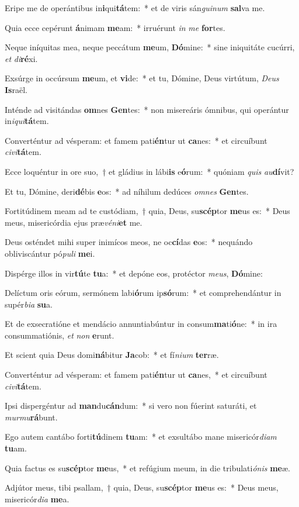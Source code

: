 \item Eripe me de operántibus in\textbf{i}qui\textbf{tá}tem:~* et de viris sán\textit{gui}\textit{num} \textbf{sal}va me.
\item Quia ecce cepérunt \textbf{á}nimam \textbf{me}am:~* irruérunt \textit{in} \textit{me} \textbf{for}tes.
\item Neque iníquitas mea, neque peccátum \textbf{me}um, \textbf{Dó}mine:~* sine iniquitáte cucúrri, \textit{et} \textit{di}\textbf{ré}xi.
\item Exsúrge in occúrsum \textbf{me}um, et \textbf{vi}de:~* et tu, Dómine, Deus virtútum, \textit{De}\textit{us} \textbf{Is}raël.
\item Inténde ad visitándas \textbf{om}nes \textbf{Gen}tes:~* non misereáris ómnibus, qui operántur in\textit{i}\textit{qui}\textbf{tá}tem.
\item Converténtur ad vésperam: et famem pati\textbf{én}tur ut \textbf{ca}nes:~* et circuíbunt \textit{ci}\textit{vi}\textbf{tá}tem.
\item Ecce loquéntur in ore suo,~† et gládius in lábi\textbf{is} e\textbf{ó}rum:~* quóniam \textit{quis} \textit{au}\textbf{dí}vit?
\item Et tu, Dómine, deri\textbf{dé}bis \textbf{e}os:~* ad níhilum dedúces \textit{om}\textit{nes} \textbf{Gen}tes.
\item Fortitúdinem meam ad te custódiam,~† quia, Deus, su\textbf{scép}tor \textbf{me}us es:~* Deus meus, misericórdia ejus præ\textit{vé}\textit{ni}\textbf{et} me.
\item Deus osténdet mihi super inimícos meos, ne oc\textbf{cí}das \textbf{e}os:~* nequándo obliviscántur pó\textit{pu}\textit{li} \textbf{me}i.
\item Dispérge illos in vir\textbf{tú}te \textbf{tu}a:~* et depóne eos, protéctor \textit{me}\textit{us}, \textbf{Dó}mine:
\item Delíctum oris eórum, sermónem labi\textbf{ó}rum ip\textbf{só}rum:~* et comprehendántur in supér\textit{bi}\textit{a} \textbf{su}a.
\item Et de exsecratióne et mendácio annuntiabúntur in consum\textbf{ma}ti\textbf{ó}ne:~* in ira consummatiónis, \textit{et} \textit{non} \textbf{e}runt.
\item Et scient quia Deus domi\textbf{ná}bitur \textbf{Ja}cob:~* et fí\textit{ni}\textit{um} \textbf{ter}ræ.
\item Converténtur ad vésperam: et famem pati\textbf{én}tur ut \textbf{ca}nes,~* et circuíbunt \textit{ci}\textit{vi}\textbf{tá}tem.
\item Ipsi dispergéntur ad \textbf{man}du\textbf{cán}dum:~* si vero non fúerint saturáti, et \textit{mur}\textit{mu}\textbf{rá}bunt.
\item Ego autem cantábo forti\textbf{tú}dinem \textbf{tu}am:~* et exsultábo mane misericór\textit{di}\textit{am} \textbf{tu}am.
\item Quia factus es su\textbf{scép}tor \textbf{me}us,~* et refúgium meum, in die tribulati\textit{ó}\textit{nis} \textbf{me}æ.
\item Adjútor meus, tibi psallam,~† quia, Deus, su\textbf{scép}tor \textbf{me}us es:~* Deus meus, misericór\textit{di}\textit{a} \textbf{me}a.
